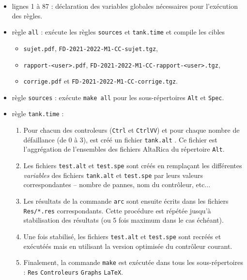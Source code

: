 \documentclass[a4paper]{book}
\begin{document}
\begin{itemize}
  \item lignes 1 à 87 : déclaration des variables globales nécessaires pour l'exécution des règles.
  \item règle \texttt{all} : exécute les règles \texttt{sources} et
    \texttt{tank.time} et compile les cibles
    \begin{itemize}
      \item \texttt{sujet.pdf}, \texttt{FD-2021-2022-M1-CC-sujet.tgz},
      \item \texttt{rapport-<user>.pdf}, \texttt{FD-2021-2022-M1-CC-rapport-<user>.tgz},
      \item \texttt{corrige.pdf} et \texttt{FD-2021-2022-M1-CC-corrige.tgz}.
    \end{itemize}
  \item règle \texttt{sources} : exécute \texttt{make all} pour les
    sous-répertoires \texttt{Alt} et \texttt{Spec}.
  \item règle \texttt{tank.time} :
      \begin{enumerate}
          \item Pour chacun des controleurs (\texttt{Ctrl} et \texttt{CtrlVV})
            et pour chaque nombre de défaillance (de 0 à 3), est
            créé un fichier \texttt{tank.alt} . Ce fichier est l'aggrégation de
            l'ensembles des fichiers AltaRica du répertoire \texttt{Alt}.
          \item Les fichiers \texttt{test.alt} et \texttt{test.spe} sont créés
            en remplaçant les différentes \textit{variables} des fichiers
            \texttt{tank.alt} et \texttt{test.spe} par leurs valeurs
            correspondantes -- nombre de pannes, nom du contrôleur, etc...
          \item Les résultats de la commande \texttt{arc} sont ensuite écrits
            dans les fichiers \texttt{Res/*.res} correspondants.
            Cette procédure est répétée jusqu'à stabilisation des résultats (ou
            5 fois maximum dans le cas échéant).
          \item Une fois stabilisé, les fichiers \texttt{test.alt} et
            \texttt{test.spe} sont recréés et exécutéés mais en utilisant la
            version optimisée du contrôleur courant.
          \item Finalement, la commande \texttt{make} est exécutée dans
            tous les sous-répertoires : \texttt{Res} \texttt{Controleurs}
            \texttt{Graphs} \texttt{LaTeX}.
      \end{enumerate}
\end{itemize}
\end{document}
